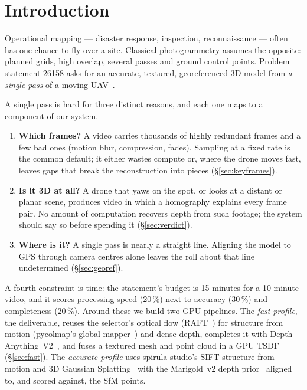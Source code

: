 \documentclass[10pt,a4paper,twocolumn]{article}
\begin{document}
\section{Introduction}
Operational mapping --- disaster response, inspection, reconnaissance --- often has one chance to fly over a site. Classical photogrammetry assumes the opposite: planned grids, high overlap, several passes and ground control points. Problem statement 26158 asks for an accurate, textured, georeferenced 3D model from \emph{a single pass} of a moving UAV~\cite{sih2026ps26158}.

A single pass is hard for three distinct reasons, and each one maps to a component of our system.
\begin{enumerate}
\item \textbf{Which frames?} A video carries thousands of highly redundant frames and a few bad ones (motion blur, compression, fades). Sampling at a fixed rate is the common default; it either wastes compute or, where the drone moves fast, leaves gaps that break the reconstruction into pieces (\S\ref{sec:keyframes}).
\item \textbf{Is it 3D at all?} A drone that yaws on the spot, or looks at a distant or planar scene, produces video in which a homography explains every frame pair. No amount of computation recovers depth from such footage; the system should say so before spending it (\S\ref{sec:verdict}).
\item \textbf{Where is it?} A single pass is nearly a straight line. Aligning the model to GPS through camera centres alone leaves the roll about that line undetermined (\S\ref{sec:georef}).
\end{enumerate}
A fourth constraint is time: the statement's budget is 15 minutes for a 10-minute video, and it scores processing speed (20\,\%) next to accuracy (30\,\%) and completeness (20\,\%). Around these we build two GPU pipelines. The \emph{fast profile}, the deliverable, reuses the selector's optical flow (RAFT~\cite{teed2020raft}) for structure from motion (pycolmap's global mapper~\cite{pan2024glomap}) and dense depth, completes it with Depth Anything~V2~\cite{yang2024dav2}, and fuses a textured mesh and point cloud in a GPU TSDF~\cite{curless1996volumetric,zhou2018open3d} (\S\ref{sec:fast}). The \emph{accurate profile} uses spirula-studio's SIFT structure from motion and 3D Gaussian Splatting~\cite{spirulastudio,kerbl2023gaussians} with the Marigold~v2 depth prior~\cite{pavlovic2026marigoldv2} aligned to, and scored against, the SfM points.
\end{document}
